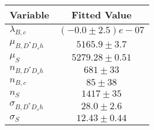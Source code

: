 \begin{tabular}[t]{lc}
\hline
Variable &Fitted Value\\
\hline\hline
$\lambda_{B,c}$&$(-0.0\pm2.5)e-07$\\
\hline
$\mu_{B, D^* D_s h}$&$5165.9\pm3.7$\\
\hline
$\mu_S$&$5279.28\pm0.51$\\
\hline
$n_{B, D^* D_s h}$&$681\pm33$\\
\hline
$n_{B,c}$&$85\pm38$\\
\hline
$n_S$&$1417\pm35$\\
\hline
$\sigma_{B, D^* D_s h}$&$28.0\pm2.6$\\
\hline
$\sigma_S$&$12.43\pm0.44$\\
\hline
\end{tabular}